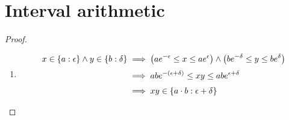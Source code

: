 \section{Interval arithmetic}



\begin{proof} ~
  \begin{enumerate}
    \item

      \begin{align}
        x \in \ean[\epsilon]{a} \land y \in \ean[\delta]{b} & \implies \left(ae^{-\epsilon} \le x \le ae^{\epsilon}\right) \land \left(be^{-\delta} \le y \le be^\delta\right) \nl
        & \implies abe^{-(\epsilon+\delta)} \le xy \le abe^{\epsilon+\delta} \nl
        & \implies xy \in \ean[\epsilon+\delta]{a\cdot b}
      \end{align}
  \end{enumerate}

\end{proof}
